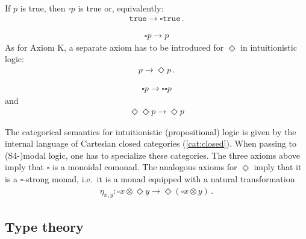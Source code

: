     \begin{axiom}[Necessitation]
        If $p$ is true, then $\square p$ is true or, equivalently:
        \begin{gather}
            \mathtt{true}\rightarrow\square\mathtt{true}\,.
        \end{gather}
    \end{axiom}

    \begin{axiom}[T]
        \begin{gather}
            \square p\rightarrow p
        \end{gather}
        As for Axiom K, a separate axiom has to be introduced for $\Diamond$ in intuitionistic logic:
        \begin{gather}
            p\rightarrow\Diamond p\,.
        \end{gather}
    \end{axiom}

    \begin{axiom}[S4]
        \begin{gather}
            \square p\rightarrow\square\square p
        \end{gather}
        and
        \begin{gather}
            \Diamond\Diamond p\rightarrow\Diamond p
        \end{gather}
    \end{axiom}

    The categorical semantics for intuitionistic (propositional) logic is given by the internal language of Cartesian closed categories (\cref{cat:closed}). When passing to (S4-)modal logic, one has to specialize these categories. The three axioms above imply that $\square$ is a monoidal comonad. The analogous axioms for $\Diamond$ imply that it is a $\square$-strong monad, i.e.~it is a monad equipped with a natural transformation
    \begin{gather}
        \eta_{x,y}:\square x\otimes\Diamond y\rightarrow\Diamond(\square x\otimes y)\,.
    \end{gather}

\subsection{Type theory}\label{section:modal_type_theory}


